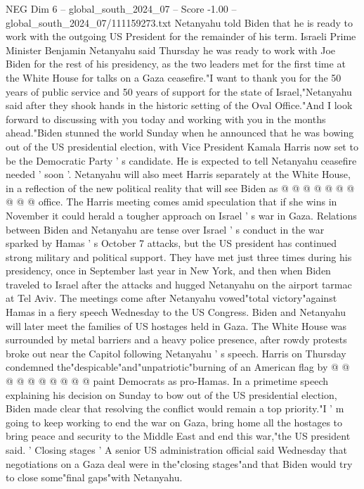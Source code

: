 \begin{textsample}{NEG Dim 6 – global\_south\_2024\_07 – Score -1.00 – global\_south\_2024\_07/111159273.txt}  \label{ex:f6_neg_118}
Netanyahu told Biden that he is ready to work with the outgoing US President for the remainder of his term.
Israeli Prime Minister Benjamin Netanyahu said Thursday he was ready to work with Joe Biden for the rest of his presidency, as the two leaders met for the first time at the White House for talks on a Gaza ceasefire."I want to thank you for the 50 years of public service and 50 years of support for the state of Israel,"Netanyahu said after they shook hands in the historic setting of the Oval Office."And I look forward to discussing with you today and working with you in the months ahead."Biden stunned the world Sunday when he announced that he was bowing out of the US presidential election, with Vice President Kamala Harris now set to be the Democratic Party ' s candidate.
He is expected to tell Netanyahu ceasefire needed ' soon '.
Netanyahu will also meet Harris separately at the White House, in a reflection of the new political reality that will see Biden as @ @ @ @ @ @ @ @ @ @ office.
The Harris meeting comes amid speculation that if she wins in November it could herald a tougher approach on Israel ' s war in Gaza.
Relations between Biden and Netanyahu are tense over Israel ' s conduct in the war sparked by Hamas ' s October 7 attacks, but the US president has continued strong military and political support.
They have met just three times during his presidency, once in September last year in New York, and then when Biden traveled to Israel after the attacks and hugged Netanyahu on the airport tarmac at Tel Aviv.
The meetings come after Netanyahu vowed"total victory"against Hamas in a fiery speech Wednesday to the US Congress.
Biden and Netanyahu will later meet the families of US hostages held in Gaza.
The White House was surrounded by metal barriers and a heavy police presence, after rowdy protests broke out near the Capitol following Netanyahu ' s speech.
Harris on Thursday condemned the"despicable"and"unpatriotic"burning of an American flag by @ @ @ @ @ @ @ @ @ @ paint Democrats as pro-Hamas.
In a primetime speech explaining his decision on Sunday to bow out of the US presidential election, Biden made clear that resolving the conflict would remain a top priority."I ' m going to keep working to end the war on Gaza, bring home all the hostages to bring peace and security to the Middle East and end this war,"the US president said. ' Closing stages ' A senior US administration official said Wednesday that negotiations on a Gaza deal were in the"closing stages"and that Biden would try to close some"final gaps"with Netanyahu.

\end{textsample}
